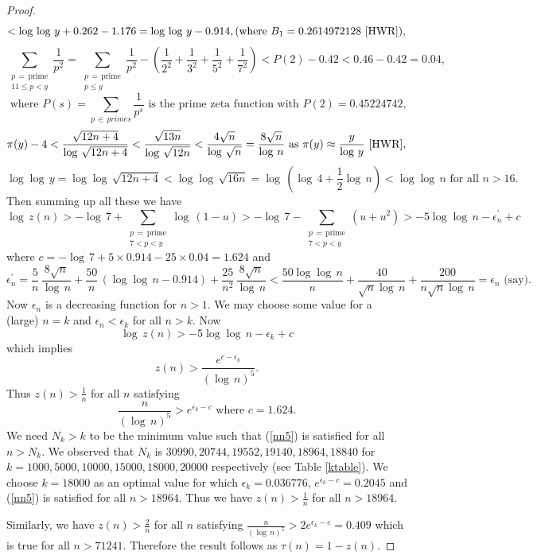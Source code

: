 \documentclass[11pt]{article}
\theoremstyle{definition}
\theoremstyle{remark}
\numberwithin{equation}{section}
\begin{document}
\begin{proof}
$$<\log\, \log\, y +0.262-1.176=\log\, \log\, y-0.914, (\text{where } B_1=0.2614972128\ \cite{HWR}),$$
$$\sum\limits_{\substack{p\, =\, \text{prime}\\ 11\leq p<y}} \frac{1}{p^2}=\sum\limits_{\substack{p\, =\, \text{prime}\\ p\leq y}} \frac{1}{p^2} -\left(\frac{1}{2^2}+\frac{1}{3^2}+\frac{1}{5^2}+\frac{1}{7^2}\right)<P(2)-0.42<0.46-0.42=0.04,$$
$$\text{ where }P(s)= \sum\limits_{p\,\in\, primes} \frac{1}{p^s} \text{ is the prime zeta function with } P(2)=0.45224742,$$ 
$$\pi(y)-4<\frac{\sqrt{12n+4}}{\log\,\sqrt{12n+4}}<\frac{\sqrt{13n}}{\log\,\sqrt{12n}}<\frac{4\sqrt{n}}{\log\,\sqrt{n}}=\frac{8\sqrt{n}}{\log\, n} \text{ as }\pi(y)\approx\frac{y}{\log\, y}\ \cite{HWR},$$
$$\log\log\, y=\log\log\,\sqrt{12n+4}<\log\log\,\sqrt{16n}=\log\, (\log\, 4+\frac{1}{2}\log\, n)<\log\log\, n\text{ for all } n>16.$$
Then summing up all these we have
$$\log\, z(n)>-\log\, 7+\sum\limits_{\substack{p\, =\, \text{prime}\\ 7<p<y}} \log\,(1-u)>-\log\, 7-\sum\limits_{\substack{p\, =\, \text{prime}\\ 7<p<y}} (u+u^2) >-5\log\log\, n -\epsilon^\prime_n+c$$
where $c=-\log\, 7+5\times 0.914-25\times 0.04=1.624$ and 
$$\epsilon^\prime_n=\frac{5}{n}\,\frac{8\sqrt{n}}{\log\, n}+\frac{50}{n}\,(\log\log\, n-0.914)+\frac{25}{n^2}\,\frac{8\sqrt{n}}{\log\, n}<\frac{50\log\log\, n}{n}+\frac{40}{\sqrt{n}\log\, n}+\frac{200}{n\sqrt{n}\log\, n}=\epsilon_n \text{ (say)}.$$
Now $\epsilon_n$ is a decreasing function for $n>1$. We may choose some value for a (large) $n=k$ and $\epsilon_n<\epsilon_k$ for all $n>k$. Now
$$\log\, z(n)>-5\log\log\, n -\epsilon_k+c$$
which implies 
$$z(n)>\frac{e^{c-\epsilon_k}}{(\log\, n)^5}.$$
Thus $z(n)>\frac{1}{n}$ for all $n$ satisfying 
\begin{equation}\label{nn5}
\frac{n}{(\log\, n)^5}>e^{\epsilon_k-c} \text{ where } c=1.624. 
\end{equation}
We need $N_k>k$ to be the minimum value such that (\ref{nn5}) is satisfied for all $n>N_k$. We observed that $N_k$ is $30990,20744,19552,19140,18964,18840$ for $k=1000,5000,10000,15000,18000,20000$ respectively (see Table \ref{ktable}). We choose $k=18000$ as an optimal value for which $\epsilon_k=0.036776$, $e^{\epsilon_k-c}=0.2045$ and (\ref{nn5}) is satisfied for all $n>18964$. Thus we have $z(n)>\frac{1}{n}$ for all $n>18964$.

\vspace{1em}
\noindent
Similarly, we have 
$z(n)>\frac{2}{n}$ for all $n$ satisfying $\frac{n}{(\log\, n)^5}>2e^{\epsilon_k-c}=0.409$ which is true for all $n>71241$. 
Therefore the result follows as $\tau(n)=1-z(n)$.
\end{proof}
\end{document}
